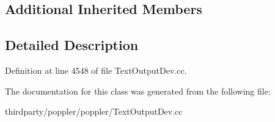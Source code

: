 \subsection*{Additional Inherited Members}


\subsection{Detailed Description}


Definition at line 4548 of file Text\+Output\+Dev.\+cc.



The documentation for this class was generated from the following file\+:\begin{DoxyCompactItemize}
\item 
thirdparty/poppler/poppler/Text\+Output\+Dev.\+cc\end{DoxyCompactItemize}
